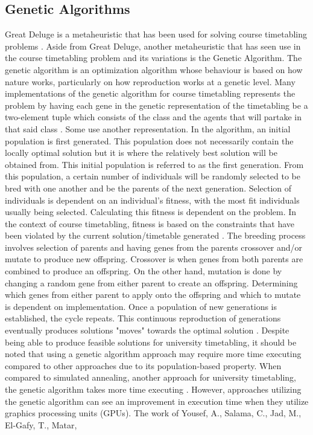 \subsection{Genetic Algorithms}
Great Deluge is a metaheuristic \cite{intro-gd-dueck} that has been used for solving course timetabling problems \cite{gd-burke}\cite{nlgd-landa-silva}\cite{nlgdrl-obit}. Aside from Great Deluge, another metaheuristic that has seen use in the course timetabling problem and its variations is the Genetic Algorithm. The genetic algorithm is an optimization algorithm whose behaviour is based on how nature works, particularly on how reproduction works at a genetic level. Many implementations of the genetic algorithm for course timetabling represents the problem by having each gene in the genetic representation of the timetabling be a two-element tuple which consists of the class and the agents that will partake in that said class \cite{alves-novel-recursive}\cite{raghavjee-ga-south-africa}\cite{supachate-noval-approach-ga-thai}. Some use another representation. In the algorithm, an initial population is first generated. This population does not necessarily contain the locally optimal solution but it is where the relatively best solution will be obtained from. This initial population is referred to as the first generation. From this population, a certain number of individuals will be randomly selected to be bred with one another and be the parents of the next generation. Selection of individuals is dependent on an individual's fitness, with the most fit individuals usually being selected. Calculating this fitness is dependent on the problem. In the context of course timetabling, fitness is based on the constraints that have been violated by the current solution/timetable generated \cite{alves-novel-recursive}\cite{raghavjee-ga-south-africa}\cite{johan-ga-sa-comparison}\cite{yik-ga-timetabling}\cite{supachate-noval-approach-ga-thai}\cite{wutthipong-performance-study-genetic-operators}\cite{sanjay-an-application-of-ga}. The breeding process involves selection of parents and having genes from the parents crossover and/or mutate to produce new offspring. Crossover is when genes from both parents are combined to produce an offspring. On the other hand, mutation is done by changing a random gene from either parent to create an offspring. Determining which genes from either parent to apply onto the offspring and which to mutate is dependent on implementation. Once a population of new generations is established, the cycle repeats. This continuous reproduction of generations eventually produces solutions "moves" towards the optimal solution \cite{what-is-ga}. Despite being able to produce feasible solutions for university timetabling, it should be noted that using a genetic algorithm approach may require more time executing compared to other approaches due to its population-based property. When compared to simulated annealing, another approach for university timetabling, the genetic algorithm takes more time executing \cite{johan-ga-sa-comparison}. However, approaches utilizing the genetic algorithm can see an improvement in execution time when they utilize graphics processing units (GPUs). The work of Yousef, A., Salama, C., Jad, M., El-Gafy, T., Matar, 